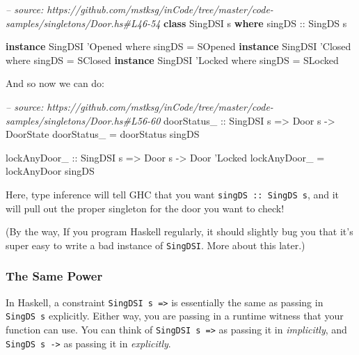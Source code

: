 \documentclass[]{article}
\newenvironment{Shaded}{}{}
\newcommand{\KeywordTok}[1]{\textcolor[rgb]{0.00,0.44,0.13}{\textbf{#1}}}
\newcommand{\DataTypeTok}[1]{\textcolor[rgb]{0.56,0.13,0.00}{#1}}
\newcommand{\CharTok}[1]{\textcolor[rgb]{0.25,0.44,0.63}{#1}}
\newcommand{\CommentTok}[1]{\textcolor[rgb]{0.38,0.63,0.69}{\textit{#1}}}
\newcommand{\OtherTok}[1]{\textcolor[rgb]{0.00,0.44,0.13}{#1}}
\newcommand{\FunctionTok}[1]{\textcolor[rgb]{0.02,0.16,0.49}{#1}}
\newcommand{\NormalTok}[1]{#1}
\begin{document}
\begin{Shaded}
\begin{Highlighting}[]
\CommentTok{-- source: https://github.com/mstksg/inCode/tree/master/code-samples/singletons/Door.hs#L46-54}
\KeywordTok{class} \DataTypeTok{SingDSI}\NormalTok{ s }\KeywordTok{where}
\OtherTok{    singDS ::} \DataTypeTok{SingDS}\NormalTok{ s}

\KeywordTok{instance} \DataTypeTok{SingDSI} \CharTok{'Opened where}
\NormalTok{    singDS }\FunctionTok{=} \DataTypeTok{SOpened}
\KeywordTok{instance} \DataTypeTok{SingDSI} \CharTok{'Closed where}
\NormalTok{    singDS }\FunctionTok{=} \DataTypeTok{SClosed}
\KeywordTok{instance} \DataTypeTok{SingDSI} \CharTok{'Locked where}
\NormalTok{    singDS }\FunctionTok{=} \DataTypeTok{SLocked}
\end{Highlighting}
\end{Shaded}

And so now we can do:

\begin{Shaded}
\begin{Highlighting}[]
\CommentTok{-- source: https://github.com/mstksg/inCode/tree/master/code-samples/singletons/Door.hs#L56-60}
\OtherTok{doorStatus_ ::} \DataTypeTok{SingDSI}\NormalTok{ s }\OtherTok{=>} \DataTypeTok{Door}\NormalTok{ s }\OtherTok{->} \DataTypeTok{DoorState}
\NormalTok{doorStatus_ }\FunctionTok{=}\NormalTok{ doorStatus singDS}

\OtherTok{lockAnyDoor_ ::} \DataTypeTok{SingDSI}\NormalTok{ s }\OtherTok{=>} \DataTypeTok{Door}\NormalTok{ s }\OtherTok{->} \DataTypeTok{Door} \CharTok{'Locked}
\NormalTok{lockAnyDoor_ }\FunctionTok{=}\NormalTok{ lockAnyDoor singDS}
\end{Highlighting}
\end{Shaded}

Here, type inference will tell GHC that you want \texttt{singDS\ ::\ SingDS\ s},
and it will pull out the proper singleton for the door you want to check!

(By the way, If you program Haskell regularly, it should slightly bug you that
it's super easy to write a bad instance of \texttt{SingDSI}. More about this
later.)

\subsubsection{The Same Power}\label{the-same-power}

In Haskell, a constraint \texttt{SingDSI\ s\ =\textgreater{}} is essentially the
same as passing in \texttt{SingDS\ s} explicitly. Either way, you are passing in
a runtime witness that your function can use. You can think of
\texttt{SingDSI\ s\ =\textgreater{}} as passing it in \emph{implicitly}, and
\texttt{SingDS\ s\ -\textgreater{}} as passing it in \emph{explicitly}.
\end{document}
